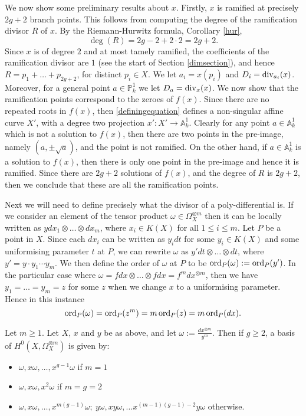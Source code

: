 We now show some preliminary results about $x$. 
Firstly, $x$ is ramified at precisely $2g + 2$ branch points.
This follows from computing the degree of the ramification divisor $R$ of $x$.
By the Riemann-Hurwitz formula, Corollary \ref{hur},
    \[ 
    \deg(R) = 2g -2 +2\cdot 2 = 2g + 2.
    \]
Since $x$ is of degree $2$ and at most tamely ramified, the coefficients of the ramification divisor are $1$ (see the start of Section \ref{dimsection}), and hence $R = p_1 + \ldots + p_{2g+2}$, for distinct $p_i\in X$.
We let $a_i = x(p_i)$ and $D_i = \operatorname{div}_{a_i}(x)$.
Moreover, for a general point $a \in \mathbb P_k^1$ we let $D_a = \operatorname{div}_x(x)$.
We now show that the ramification points correspond to the zeroes of $f(x)$.
Since there are no repeated roots in $f(x)$, then \eqref{definingequation} defines a non-singular affine curve $X'$, with a degree two projection $x': X'\rightarrow \mathbb A_k^1$.
Clearly for any point $a\in \mathbb A_k^1$ which is not a solution to $f(x)$, then there are two points in the pre-image, namely $(a,\pm \sqrt{a})$, and the point is not ramified.
On the other hand, if $a\in \mathbb A_k^1$ is a solution to $f(x)$, then there is only one point in the pre-image and hence it is ramified.
Since there are $2g+2$ solutions of $f(x)$, and the degree of $R$ is $2g+2$, then we conclude that these are all the ramification points.

Next we will need to define precisely what the divisor of a poly-differential is.
If we consider an element of the tensor product $\omega \in \Omega_X^{\otimes m}$ then it can be locally written as $y dx_1\otimes \ldots \otimes dx_m$, where $x_i \in K(X)$ for all $1 \leq i \leq m$.
Let $P$ be a point in $X$.
Since each $dx_i$ can be written as $y_i dt$ for some $y_i\in K(X)$ and some uniformising parameter $t$ at $P$, we can rewrite $\omega$ as $y' dt \otimes \ldots \otimes dt$, where $y' = y \cdot y_1 \cdots y_m$.
We then define the order of $\omega$ at $P$ to be $\operatorname{ord}_P(\omega ) := \operatorname{ord}_P(y')$.
In the particular case where $\omega = fdx \otimes \ldots \otimes fdx = f^m dx^{\otimes m}$, then we have $y_1 = \ldots = y_m = z$ for some $z$ when we change $x$ to a uniformising parameter.
Hence in this instance 
    \[ 
    \operatorname{ord}_P(\omega) = \operatorname{ord}_P(z^m) = m\operatorname{ord}_P(z) = m\operatorname{ord}_P(dx).
    \]



    \begin{prop}\label{prophyperellipticbasispnot2}
    Let $m\geq 1$.
    Let $X$, $x$ and $y$ be as above, and let $\omega := \frac{dx^{\otimes m}}{y^m}$. 
    Then if $g\geq 2$, a basis of $H^0(X,\Omega_X^{\otimes m})$ is given by:
        \begin{itemize}
        \item $\omega, x\omega, \ldots , x^{g-1}\omega$ if $m=1$ 
        \item $\omega, x\omega, x^2\omega$  if $m=g=2$ 
        \item $\omega, x\omega, \ldots, x^{m(g-1)}\omega;\  y\omega, xy\omega, \ldots x^{(m-1)(g-1)-2}y\omega$ otherwise.
        \end{itemize}
    \end{prop}
    
